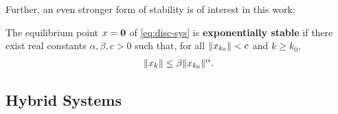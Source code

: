 Further, an even stronger form of stability is of interest in this work:
\begin{definition}
  The equilibrium point $x = {\mathbf 0}$ of \eqref{eq:disc-sys} is {\bf
    exponentially stable} if there exist real constants $\alpha, \beta, c> 0$
  such that, for all $\|x_{k_{0}}\| < c$ and $k \geq k_{0}$,
  \begin{align*}
    \|x_{k}\| \leq \beta \|x_{k_{0}}\|^{\alpha}.
  \end{align*}
\end{definition}

\subsection{Hybrid Systems}